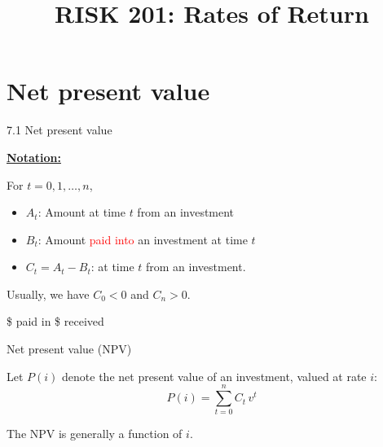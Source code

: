 \documentclass{beamer}
\title{RISK 201: Rates of Return}
\begin{document}
\maketitle

\section{Net present value}

\begin{frame}{7.1 Net present value}

\underline{\textbf{Notation:}}

For $t = 0, 1, \ldots, n$,
\begin{itemize}
\item $A_t$: Amount  at time $t$ from an investment
\item $B_t$: Amount \textcolor{red}{paid into} an investment at time $t$
\item $C_t = A_t - B_t$:  at time $t$ from an investment.
\end{itemize}

\bigskip
Usually, we have $C_0 < 0$ and $C_n > 0$.

\medskip
\begin{center}
\$ paid in \qquad\qquad \$ received
\end{center}

\end{frame}

\begin{frame}{Net present value (NPV)}

Let $P(i)$ denote the net present value of an investment, valued at rate $i$:
\[
P(i) = \sum_{t=0}^{n} C_t\, v^t
\]

\bigskip
The NPV is generally a  function of $i$.

\end{frame}
\end{document}
